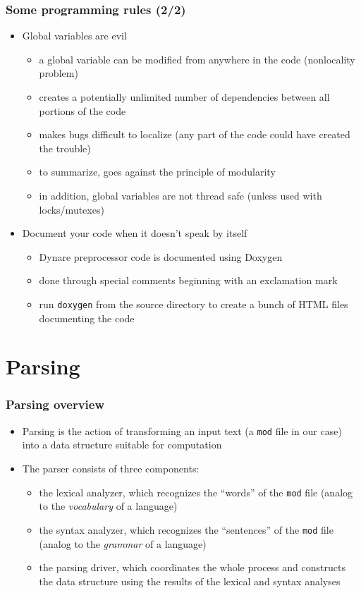 \documentclass{beamer}
\begin{document}
\begin{frame}
  \frametitle{Some programming rules (2/2)}
  \begin{itemize}
  \item Global variables are evil
    \begin{itemize}
    \item a global variable can be modified from anywhere in the code (nonlocality problem)
    \item creates a potentially unlimited number of dependencies between all portions of the code
    \item makes bugs difficult to localize (any part of the code could have created the trouble)
    \item to summarize, goes against the principle of modularity
    \item in addition, global variables are not thread safe (unless used with locks/mutexes)
    \end{itemize}
  \item Document your code when it doesn't speak by itself
    \begin{itemize}
    \item Dynare preprocessor code is documented using Doxygen
    \item done through special comments beginning with an exclamation mark
    \item run \texttt{doxygen} from the source directory to create a bunch of HTML files documenting the code
    \end{itemize}
  \end{itemize}
\end{frame}

\section{Parsing}

\begin{frame}
\frametitle{Parsing overview}
\begin{itemize}
\item Parsing is the action of transforming an input text (a \texttt{mod} file in our case) into a data structure suitable for computation
\item The parser consists of three components:
  \begin{itemize}
  \item the \alert{lexical analyzer}, which recognizes the ``words'' of the \texttt{mod} file (analog to the \textit{vocabulary} of a language)
  \item the \alert{syntax analyzer}, which recognizes the ``sentences'' of the \texttt{mod} file (analog to the \textit{grammar} of a language)
  \item the \alert{parsing driver}, which coordinates the whole process and constructs the data structure using the results of the lexical and syntax analyses
  \end{itemize}
\end{itemize}
\end{frame}
\end{document}
